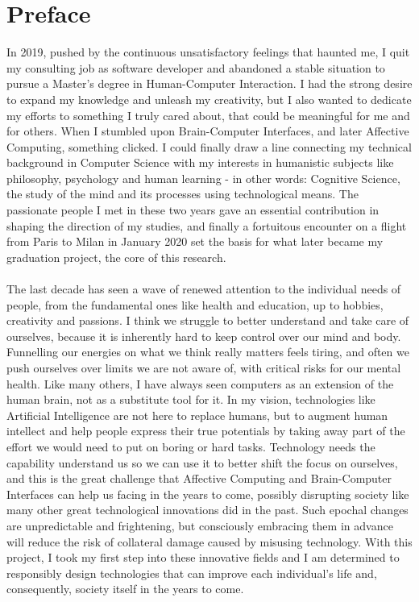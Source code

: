 \chapter{Preface }
\pagestyle{headings}

In 2019, pushed by the continuous unsatisfactory feelings that haunted me, I quit my consulting job as software developer and abandoned a stable situation to pursue a Master's degree in Human-Computer Interaction. I had the strong desire to expand my knowledge and unleash my creativity, but I also wanted to dedicate my efforts to something I truly cared about, that could be meaningful for me and for others. When I stumbled upon Brain-Computer Interfaces, and later Affective Computing, something clicked. I could finally draw a line connecting my technical background in Computer Science with my interests in humanistic subjects like philosophy, psychology and human learning - in other words: Cognitive Science, the study of the mind and its processes using technological means. The passionate people I met in these two years gave an essential contribution in shaping the direction of my studies, and finally a fortuitous encounter on a flight from Paris to Milan in January 2020 set the basis for what later became my graduation project, the core of this research. 
\\
\\
The last decade has seen a wave of renewed attention to the individual needs of people, from the fundamental ones like health and education, up to hobbies, creativity and passions. I think we struggle to better understand and take care of ourselves, because it is inherently hard to keep control over our mind and body. Funnelling our energies on what we think really matters feels tiring, and often we push ourselves over limits we are not aware of, with critical risks for our mental health. Like many others, I have always seen computers as an extension of the human brain, not as a substitute tool for it. In my vision, technologies like Artificial Intelligence are not here to replace humans, but to augment human intellect and help people express their true potentials by taking away part of the effort we would need to put on boring or hard tasks. Technology needs the capability understand us so we can use it to better shift the focus on ourselves, and this is the great challenge that Affective Computing and Brain-Computer Interfaces can help us facing in the years to come, possibly disrupting society like many other great technological innovations did in the past. Such epochal changes are unpredictable and frightening, but consciously embracing them in advance will reduce the risk of collateral damage caused by misusing technology. With this project, I took my first step into these innovative fields and I am determined to responsibly design technologies that can improve each individual's life and, consequently, society itself in the years to come.

